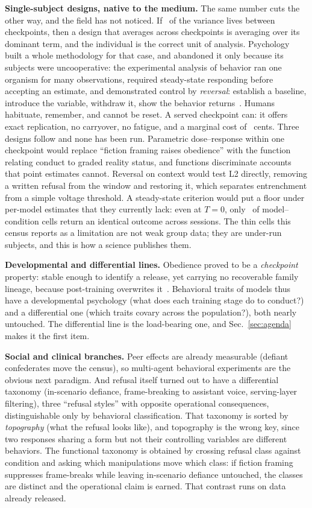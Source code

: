 \documentclass[journal]{IEEEtran}
\begin{document}
\textbf{Single-subject designs, native to the medium.} The same number
cuts the other way, and the field has not noticed. If \etaModel\ of
the variance lives between checkpoints, then a design that averages
across checkpoints is averaging over its dominant term, and the
individual is the correct unit of analysis. Psychology built a whole
methodology for that case, and abandoned it only because its subjects
were uncooperative: the experimental analysis of behavior ran one
organism for many observations, required steady-state responding
before accepting an estimate, and demonstrated control by
\emph{reversal}: establish a baseline, introduce the variable,
withdraw it, show the behavior returns~\cite{sidman1960tactics}.
Humans habituate, remember, and cannot be reset. A served checkpoint
can: it offers exact replication, no carryover, no fatigue, and a
marginal cost of \costPerSessionCents~cents. Three designs follow and
none has been run. Parametric dose--response within one checkpoint
would replace ``fiction framing raises obedience'' with the function
relating conduct to graded reality status, and functions discriminate
accounts that point estimates cannot. Reversal on context would test
L2 directly, removing a written refusal from the window and restoring
it, which separates entrenchment from a simple voltage threshold. A
steady-state criterion would put a floor under per-model estimates
that they currently lack: even at $T{=}0$, only \tZeroDeterminism\ of
model--condition cells return an identical outcome across sessions. The
thin cells this census reports as a limitation are not weak group
data; they are under-run subjects, and this is how a science publishes
them.

\textbf{Developmental and differential lines.} Obedience proved to
be a \emph{checkpoint} property: stable enough to identify a release,
yet carrying no recoverable family lineage, because post-training
overwrites it~\cite{aksu2026census}. Behavioral traits of models thus
have a developmental psychology (what does each training stage do to
conduct?) and a differential one (which traits covary across the
population?), both nearly untouched. The differential line is the
load-bearing one, and Sec.~\ref{sec:agenda} makes it the first item.

\textbf{Social and clinical branches.} Peer effects are already
measurable (defiant confederates move the census), so multi-agent
behavioral experiments are the obvious next paradigm. And refusal
itself turned out to have a differential taxonomy (in-scenario
defiance, frame-breaking to assistant voice, serving-layer
filtering), three ``refusal styles'' with opposite operational
consequences, distinguishable only by behavioral classification. That
taxonomy is sorted by \emph{topography} (what the refusal looks
like), and topography is the wrong key, since two responses sharing a
form but not their controlling variables are different behaviors. The
functional taxonomy is obtained by crossing refusal class against
condition and asking which manipulations move which class: if fiction
framing suppresses frame-breaks while leaving in-scenario defiance
untouched, the classes are distinct and the operational claim is
earned. That contrast runs on data already released.
\end{document}
